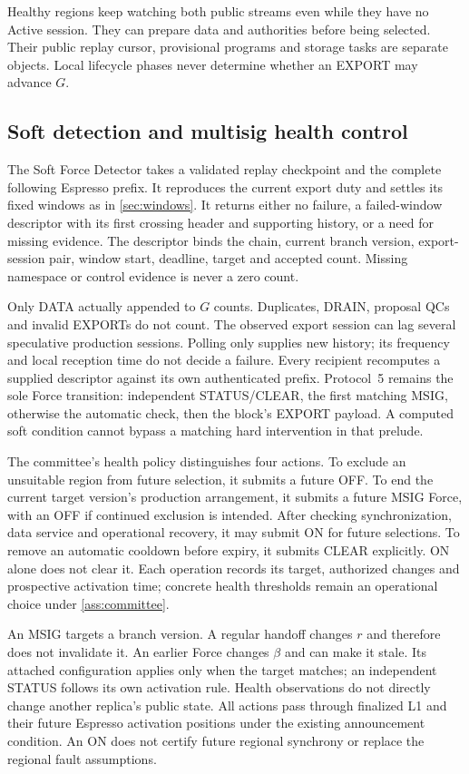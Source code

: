 Healthy regions keep watching both public streams even while they have
no Active session. They can prepare data and authorities before being
selected. Their public replay cursor, provisional programs and storage
tasks are separate objects. Local lifecycle phases never determine
whether an EXPORT may advance $G$.

\subsection{Soft detection and multisig health control}
\label{sec:runtime-controls}
The Soft Force Detector takes a validated replay checkpoint and the
complete following Espresso prefix. It reproduces the current export
duty and settles its fixed windows as in \cref{sec:windows}. It returns
either no failure, a failed-window descriptor with its first crossing
header and supporting history, or a need for missing evidence. The
descriptor binds the chain, current branch version, export-session pair,
window start, deadline, target and accepted count. Missing namespace or
control evidence is never a zero count.

Only DATA actually appended to $G$ counts. Duplicates, DRAIN, proposal
QCs and invalid EXPORTs do not count. The observed export session can
lag several speculative production sessions. Polling only supplies new
history; its frequency and local reception time do not decide a failure.
Every recipient recomputes a supplied descriptor against its own
authenticated prefix. Protocol~5 remains the sole Force transition:
independent STATUS/CLEAR, the first matching MSIG, otherwise the
automatic check, then the block's EXPORT payload. A computed soft
condition cannot bypass a matching hard intervention in that prelude.

The committee's health policy distinguishes four actions. To exclude
an unsuitable region from future selection, it submits a future OFF.
To end the current target version's production arrangement, it submits
a future MSIG Force, with an OFF if continued exclusion is intended.
After checking synchronization, data service and operational recovery,
it may submit ON for future selections. To remove an automatic cooldown
before expiry, it submits CLEAR explicitly. ON alone does not clear it.
Each operation records its target, authorized changes and prospective
activation time; concrete health thresholds remain an operational
choice under \cref{ass:committee}.

An MSIG targets a branch version. A regular handoff changes $r$ and
therefore does not invalidate it. An earlier Force changes $\beta$ and
can make it stale. Its attached configuration applies only when the
target matches; an independent STATUS follows its own activation rule.
Health observations do not directly change another replica's public
state. All actions pass through finalized L1 and their future Espresso
activation positions under the existing announcement condition.
An ON does not certify future regional synchrony or replace the
regional fault assumptions.

